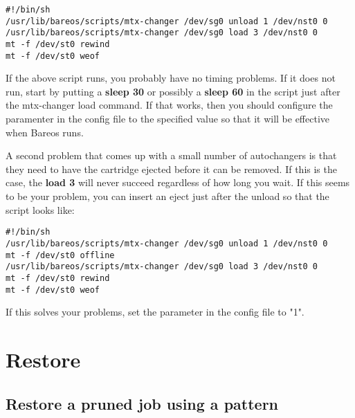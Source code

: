 \footnotesize
\begin{verbatim}
#!/bin/sh
/usr/lib/bareos/scripts/mtx-changer /dev/sg0 unload 1 /dev/nst0 0
/usr/lib/bareos/scripts/mtx-changer /dev/sg0 load 3 /dev/nst0 0
mt -f /dev/st0 rewind
mt -f /dev/st0 weof
\end{verbatim}
\normalsize

If the above script runs, you probably have no timing problems. If it does not
run, start by putting a {\bf sleep 30} or possibly a {\bf sleep 60} in the
script just after the mtx-changer load command. If that works, then you should
configure the  paramenter in the config file  to the specified value  so that it will be
effective when Bareos runs.

A second problem that comes up with a small number of autochangers is that
they need to have the cartridge ejected before it can be removed. If this is
the case, the {\bf load 3} will never succeed regardless of how long you wait.
If this seems to be your problem, you can insert an eject just after the
unload so that the script looks like:

\footnotesize
\begin{verbatim}
#!/bin/sh
/usr/lib/bareos/scripts/mtx-changer /dev/sg0 unload 1 /dev/nst0 0
mt -f /dev/st0 offline
/usr/lib/bareos/scripts/mtx-changer /dev/sg0 load 3 /dev/nst0 0
mt -f /dev/st0 rewind
mt -f /dev/st0 weof
\end{verbatim}
\normalsize

If this solves your problems, set the parameter  in the config file  to "1".





\section{Restore}

\subsection{Restore a pruned job using a pattern}

